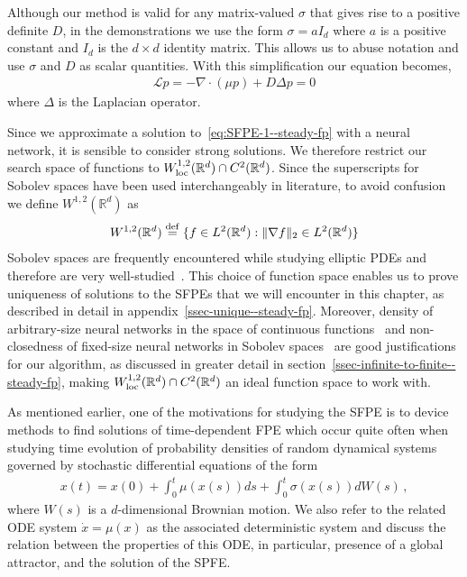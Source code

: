 Although our method is valid for any matrix-valued $\sigma$ that gives rise to a positive definite $D$, in the demonstrations we use the form  $\sigma = a I_d$ where $a$ is a positive constant and $I_d$ is the $d\times d$ identity matrix. This allows us to abuse notation and use $\sigma$ and $D$ as scalar quantities. With this simplification our equation becomes, 
\begin{align}
    \mathcal L p= -\nabla\cdot(\mu p) + D\Delta p=0\label{eq:SFPE-1--steady-fp}
\end{align}
where $\Delta$ is the Laplacian operator. 

Since we approximate a solution to~\eqref{eq:SFPE-1--steady-fp} with a neural network, it is sensible to consider strong solutions. We therefore  restrict our search space of functions to $W^{1, 2}_{\rm loc}(\mathbb R^d)\cap C^2(\mathbb R^d)$. Since the superscripts for Sobolev spaces have been used interchangeably in literature, to avoid confusion we define $W^{1, 2}(\mathbb R^d)$ as
\begin{align}
    W^{1, 2}(\mathbb R^d) \stackrel{\rm def}{=} \{f\in L^2(\mathbb R^d):\|\nabla f\|_2\in L^2(\mathbb R^d)\}\label{eq:def-Sobolev--steady-fp}
\end{align} 
Sobolev spaces are frequently encountered while studying elliptic PDEs and therefore are very well-studied~\cite{brezis2011functional, kilpelainen1994weighted}.  This choice of function space enables us to prove uniqueness of solutions to the SFPEs that we will encounter in this chapter, as described in detail in appendix~\ref{ssec-unique--steady-fp}. Moreover, density of arbitrary-size neural networks in the space of continuous functions~\cite{pinkus1999approximation} and non-closedness of fixed-size neural networks in Sobolev spaces~\cite{mahan2021nonclosedness} are good justifications for our algorithm, as discussed in greater detail in section~\ref{ssec-infinite-to-finite--steady-fp}, making $W^{1, 2}_{\rm loc}(\mathbb R^d)\cap C^2(\mathbb R^d)$ an ideal function space to work with.

As mentioned earlier, one of the motivations for studying the SFPE is to device methods to find solutions of time-dependent FPE which occur quite often when studying time evolution of probability densities of random dynamical systems governed by stochastic differential equations of the form
\begin{align}
    x(t) = x(0) + \int_0^t \mu(x(s)) ds + \int_0^t \sigma(x(s)) dW(s) \,,
\label{eq-sde--steady-fp}\end{align} 
where $W(s)$ is a $d$-dimensional Brownian motion. We also refer to the related ODE system $\dot{x} = \mu(x)$ as the associated deterministic system and discuss the relation between the properties of this ODE, in particular, presence of a global attractor, and the solution of the SPFE.

